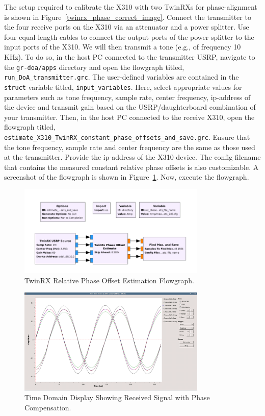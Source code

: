 \documentclass[a4paper, 11pt]{article}
\begin{document}
The setup required to calibrate the X310 with two TwinRXs for phase-alignment is shown in Figure~\ref{twinrx_phase_correct_image}. Connect the transmitter to the four receive ports on the X310 via an attenuator and a power splitter. Use four equal-length cables to connect the output ports of the power splitter to the input ports of the X310. We will then transmit a tone (e.g., of frequency 10 KHz). To do so, in the host PC connected to the transmitter USRP, navigate to the \texttt{gr-doa/apps} directory and open the flowgraph titled, \texttt{run\_DoA\_transmitter.grc}. The user-defined variables are contained in the \texttt{struct} variable titled, \texttt{input\_variables}. Here, select appropriate values for parameters such as tone frequency, sample rate, center frequency, ip-address of the device and transmit gain based on the USRP/daughterboard combination of your transmitter. Then, in the host PC connected to the receive X310, open the flowgraph titled, \texttt{estimate\_X310\_TwinRX\_constant\_phase\_offsets\_and\_save.grc}. Ensure that the tone frequency, sample rate and center frequency are the same as those used at the transmitter. Provide the ip-address of the X310 device. The config filename that contains the measured constant relative phase offsets is also customizable. A screenshot of the flowgraph is shown in Figure~\ref{twinrx_phase_est_flowgraph}. Now, execute the flowgraph. 
\begin{figure}[t]
    \centering
    \includegraphics[width=0.8\textwidth]{figures/measure_phase_offsets.png}
    \caption{TwinRX Relative Phase Offset Estimation Flowgraph.}
    \label{twinrx_phase_est_flowgraph}
\end{figure}
\begin{figure}[hb!]
    \centering
    \includegraphics[width=0.8\textwidth]{figures/Time_Sink_GUI_View_X310_TwinRX_output_with_corrected_phase_offsets.png}
    \caption{Time Domain Display Showing Received Signal with
Phase Compensation.}
    \label{time_gui_phase_comp}
\end{figure}
\end{document}
